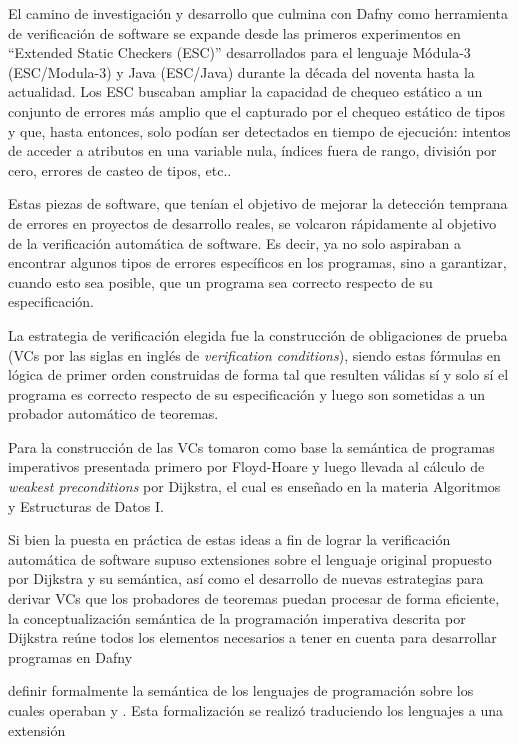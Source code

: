\documentclass[12pt, a4paper, openany, fleqn]{book}
\begin{document}
    El camino de investigación y desarrollo que culmina con Dafny como herramienta de verificación de software se expande desde las primeros experimentos en ``Extended Static Checkers (ESC)'' desarrollados para el lenguaje Módula-3 (ESC/Modula-3) y Java (ESC/Java) durante la década del noventa hasta la actualidad. Los ESC buscaban ampliar la capacidad de chequeo estático a un conjunto de errores más amplio que el capturado por el chequeo estático de tipos y que, hasta entonces, solo podían ser detectados en tiempo de ejecución: intentos de acceder a atributos en una variable nula, índices fuera de rango, división por cero, errores de casteo de tipos, etc.\cite{Leino2001}.

    Estas piezas de software, que tenían el objetivo de mejorar la detección temprana de errores en proyectos de desarrollo reales, se volcaron rápidamente al objetivo de la verificación automática de software. Es decir, ya no solo aspiraban a encontrar algunos tipos de errores específicos en los programas, sino a garantizar, cuando esto sea posible, que un programa sea correcto respecto de su especificación.

    La estrategia de verificación elegida fue la construcción de obligaciones de prueba (VCs por las siglas en inglés de \textit{verification conditions}), siendo estas fórmulas en lógica de primer orden construidas de forma tal que resulten válidas sí y solo sí el programa es correcto respecto de su especificación y luego son sometidas a un probador automático de teoremas.

    Para la construcción de las VCs tomaron como base la semántica de programas imperativos presentada primero por Floyd-Hoare y luego llevada al cálculo de \textit{weakest preconditions} por Dijkstra, el cual es enseñado en la materia Algoritmos y Estructuras de Datos I.

    Si bien la puesta en práctica de estas ideas a fin de lograr la verificación automática de software supuso extensiones sobre el lenguaje original propuesto por Dijkstra y su semántica, así como el desarrollo de nuevas estrategias para derivar VCs que los probadores de teoremas puedan procesar de forma eficiente, la conceptualización semántica de la programación imperativa descrita por Dijkstra reúne todos los elementos necesarios a tener en cuenta para desarrollar programas en Dafny


    definir formalmente la semántica de los lenguajes de programación sobre los cuales operaban y . Esta formalización se realizó traduciendo los lenguajes a una extensión  
\end{document}
